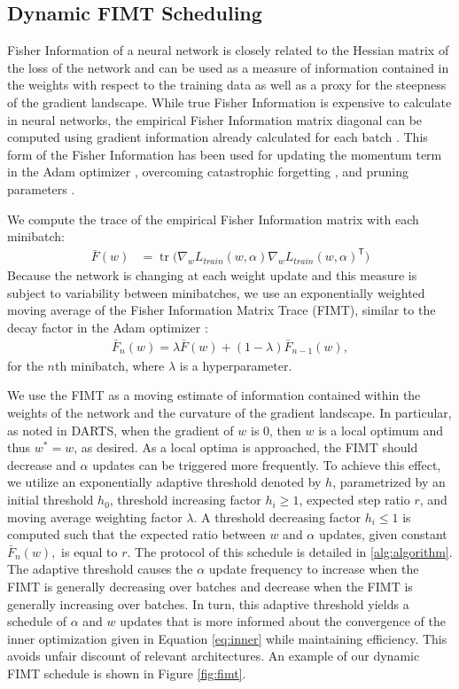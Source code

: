 \documentclass[letterpaper]{article} \usepackage{aaai22}  \usepackage{times}  \usepackage{helvet}  \usepackage{courier}  \usepackage[hyphens]{url}  \usepackage{graphicx} \urlstyle{rm} \def\UrlFont{\rm}  \usepackage{natbib}  \usepackage{caption} \DeclareCaptionStyle{ruled}{labelfont=normalfont,labelsep=colon,strut=off} \frenchspacing  \setlength{\pdfpagewidth}{8.5in}  \setlength{\pdfpageheight}{11in}  \usepackage{algorithm}
\DeclareMathOperator{\tr}{tr}
\begin{document}
\subsection{Dynamic FIMT Scheduling}
Fisher Information of a neural network is closely related to the Hessian matrix of the loss of the network and can be used as a measure of information contained in the weights with respect to the training data as well as a proxy for the steepness of the gradient landscape. While true Fisher Information is expensive to calculate in neural networks, the empirical Fisher Information matrix diagonal can be computed using gradient information already calculated for each batch \cite{martens2016second}. This form of the Fisher Information has been used for updating the momentum term in the Adam optimizer \cite{kingma2014adam}, overcoming catastrophic forgetting \cite{kirkpatrick2017overcoming}, and pruning parameters \cite{tu2016reducing,theis2018faster}.

We compute the trace of the empirical Fisher Information matrix with each minibatch:
\begin{align}
    \bar{F}(w)&=\tr\Big( \nabla_w L_{train}(w,\alpha) \nabla_w L_{train}(w,\alpha)^\mathsf{T} \Big) \label{eq:fimtbig} \end{align}
Because the network is changing at each weight update and this measure is subject to variability between minibatches, we use an exponentially weighted moving average of the Fisher Information Matrix Trace (FIMT), similar to the decay factor in the Adam optimizer \cite{kingma2014adam}:
\begin{align}
    \bar{F}_n(w)=\lambda \bar{F}(w) + (1-\lambda) \bar{F}_{n-1}(w), \label{eq:ewmafimt}
\end{align}
for the $n$th minibatch, where $\lambda$ is a hyperparameter.

We use the FIMT as a moving estimate of information contained within the weights of the network and the curvature of the gradient landscape. In particular, as noted in DARTS, when the gradient of $w$ is $0$, then $w$ is a local optimum and thus $w^*=w$, as desired. As a local optima is approached, the FIMT should decrease and $\alpha$ updates can be triggered more frequently. To achieve this effect, we utilize an exponentially adaptive threshold denoted by $h$, parametrized by an initial threshold $h_0$, threshold increasing factor $h_i \geq 1$, expected step ratio $r$, and moving average weighting factor $\lambda.$ A threshold decreasing factor $h_i \leq 1$ is computed such that the expected ratio between $w$ and $\alpha$ updates, given constant $\bar{F}_n(w),$ is equal to $r$. The protocol of this schedule is detailed in \ref{alg:algorithm}. The adaptive threshold causes the $\alpha$ update frequency to increase when the FIMT is generally decreasing over batches and decrease when the FIMT is generally increasing over batches. In turn, this adaptive threshold yields a schedule of $\alpha$ and $w$ updates that is more informed about the convergence of the inner optimization given in Equation \ref{eq:inner} while maintaining efficiency. This avoids unfair discount of relevant architectures. An example of our dynamic FIMT schedule is shown in Figure \ref{fig:fimt}. 
\end{document}
